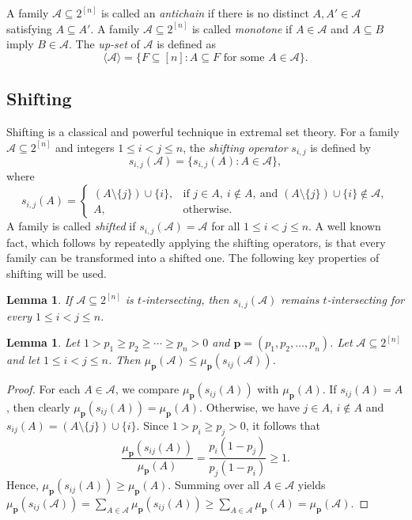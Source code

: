 \documentclass[11pt]{article}
\newtheorem{lemma}[theorem]{Lemma}
\begin{document}
A family $\mathcal{A}\subseteq 2^{[n]}$ is called an \textit{antichain} if there is no distinct $A, A'\in\mathcal{A}$ satisfying $A\subseteq A'$.
A family $\mathcal{A}\subseteq 2^{[n]}$ is called \textit{monotone} if $A\in\mathcal{A}$ and $A\subseteq B$ imply $B\in\mathcal{A}$. 
The \textit{up-set} of $\mathcal{A}$ is defined as
$$
\langle\mathcal{A}\rangle=\{F\subseteq[n]: A\subseteq F \text{ for some } A\in\mathcal{A}\}.
$$

\subsection{Shifting}

Shifting is a classical and powerful technique in extremal set theory. For a family $\mathcal{A}\subseteq 2^{[n]}$ and integers $1\le i<j\le n$, the  \textit{shifting operator} $s_{i,j}$ is defined by
$$
s_{i,j}(\mathcal{A})=\{s_{i,j}(A): A\in\mathcal{A}\},
$$
where
$$
s_{i,j}(A)=
\begin{cases}
(A\setminus\{j\})\cup\{i\}, & \text{if } j\in A,\ i\notin A,\ \text{and }(A\setminus\{j\})\cup\{i\}\notin\mathcal{A},\\
A, & \text{otherwise}.
\end{cases}
$$
A family is called \textit{shifted} if $s_{i,j}(\mathcal{A})=\mathcal{A}$ for all $1\le i<j\le n$. A well known fact, which follows by repeatedly applying the shifting operators, is that every family can be transformed into a shifted one.
The following key properties of shifting will be used.

\begin{lemma}\cite{G23}\label{G23}
If $\mathcal{A}\subseteq 2^{[n]}$ is $t$-intersecting, then $s_{i,j}(\mathcal{A})$ remains  $t$-intersecting for every $1\le i<j\le n$.
\end{lemma}

\begin{lemma}\label{le1}
Let $1 > p_1 \ge p_2 \ge \cdots \ge p_n > 0$ and $\textbf{p}=(p_1,p_2,\ldots,p_n)$.  Let $\mathcal{A} \subseteq 2^{[n]}$ and let $1\leq i<j\leq n$.
Then 
$ \mu_\textbf{p}(\mathcal{A})\le \mu_\textbf{p}(s_{ij}(\mathcal{A}))$.
\end{lemma}
\begin{proof}
For each $A \in \mathcal{A}$, we compare $\mu_{\mathbf{p}}(s_{ij}(A))$ with $\mu_{\mathbf{p}}(A)$.
If $s_{ij}(A)=A$, then clearly $\mu_{\mathbf{p}}(s_{ij}(A))=\mu_{\mathbf{p}}(A)$.
Otherwise, we have $j \in A$, $i \notin A$ and
$
s_{ij}(A) = (A\setminus\{j\}) \cup \{i\}.
$
Since $1>p_i \ge p_j > 0$, it follows that
$$
\frac{\mu_{\mathbf{p}}(s_{ij}(A))}{\mu_{\mathbf{p}}(A)}
= \frac{p_i(1-p_j)}{p_j(1-p_i)}\geq 1.
$$
 Hence, $\mu_{\mathbf{p}}(s_{ij}(A)) \ge \mu_{\mathbf{p}}(A)$. Summing over all $A \in \mathcal{A}$ yields
$
\mu_{\mathbf{p}}(s_{ij}(\mathcal{A}))
= \sum_{A \in \mathcal{A}} \mu_{\mathbf{p}}(s_{ij}(A))
\ge \sum_{A \in \mathcal{A}} \mu_{\mathbf{p}}(A)
= \mu_{\mathbf{p}}(\mathcal{A})
$.
\end{proof}
\end{document}
